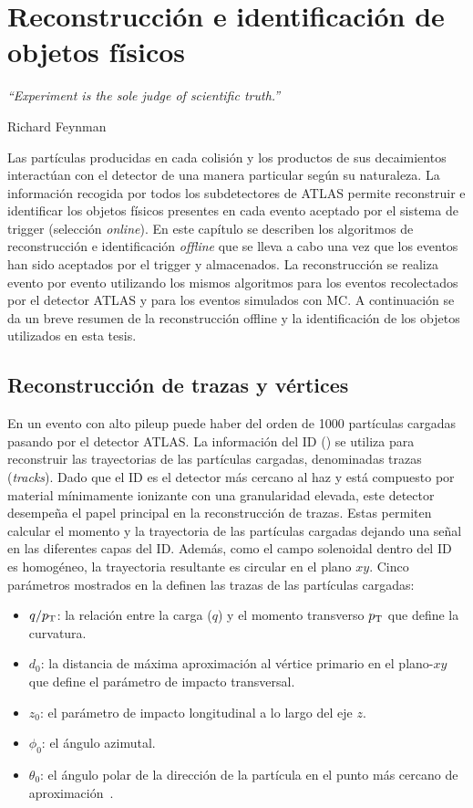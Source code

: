 \chapter{Reconstrucción e identificación de objetos físicos}
\label{ch:objects}
\epigraph{\emph{``Experiment is the sole judge of scientific truth.”}}{Richard Feynman}


Las partículas producidas en cada colisión y los productos de sus decaimientos interactúan con el detector de una manera particular según su naturaleza. La información recogida por todos los subdetectores de \ac{ATLAS} permite reconstruir e identificar los objetos físicos presentes en cada evento aceptado por el sistema de trigger (selección \textit{online}). En este capítulo se describen los algoritmos de reconstrucción e identificación \textit{offline} que se lleva a cabo una vez que los eventos han sido aceptados por el trigger y almacenados. La reconstrucción se realiza evento por evento utilizando los mismos algoritmos para los eventos recolectados por el detector \ac{ATLAS} y para los eventos simulados con \acf{MC}. A continuación se da un breve resumen de la reconstrucción offline y la identificación de los objetos utilizados en esta tesis.




\section{Reconstrucción de trazas y vértices}

En un evento con alto pileup puede haber del orden de 1000 partículas cargadas pasando por el detector \ac{ATLAS}. La información del \ac{ID} (\Sect{\ref{subsec:atlas:atlas:id}}) se utiliza para reconstruir las trayectorias de las partículas cargadas, denominadas trazas (\textit{tracks}).
Dado que el \ac{ID} es el detector más cercano al haz y está compuesto por material mínimamente ionizante con una granularidad elevada, este detector desempeña el papel principal en la reconstrucción de trazas. Estas permiten calcular el momento y la trayectoria de las partículas cargadas dejando una señal en las diferentes capas del \ac{ID}. Además, como el campo solenoidal dentro del \ac{ID} es homogéneo, la trayectoria resultante es circular en el plano \(xy\). Cinco parámetros mostrados en la \Fig{\ref{fig:objects:track_vtx:track_parameters}} definen las trazas de las partículas cargadas:
\begin{itemize}
    \item \(q/p_{\text{T}}\): la relación entre la carga (\(q\)) y el momento transverso \(p_{\text{T}}\) que define la curvatura.
    \item \(d_0\): la distancia de máxima aproximación al vértice primario en el plano-\(xy\) que define el parámetro de impacto transversal.
    \item \(z_0\): el parámetro de impacto longitudinal a lo largo del eje \(z\).
    \item \(\phi_0\): el ángulo azimutal.
    \item \(\theta_0\): el ángulo polar de la dirección de la partícula en el punto más cercano de aproximación~\cite{ATLAS-Tracks-Performance-Run2}.
\end{itemize}

